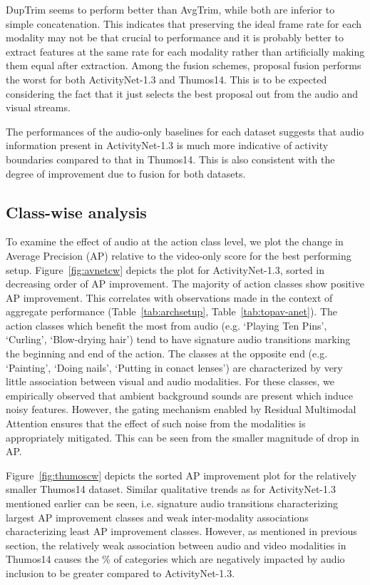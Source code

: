 \documentclass[10pt,twocolumn,letterpaper]{article}
\begin{document}
DupTrim seems to perform better than AvgTrim, while both are inferior to simple concatenation. This indicates that preserving the ideal frame rate for each modality may not be that crucial to performance and it is probably better to extract features at the same rate for each modality rather than artificially making them equal after extraction. Among the fusion schemes, proposal fusion performs the worst for both ActivityNet-1.3 and Thumos14. This is to be expected considering the fact that it just selects the best proposal out from the audio and visual streams. 

The performances of the audio-only baselines for each dataset suggests that audio information present in ActivityNet-1.3 is much more indicative of activity boundaries compared to that in Thumos14. This is also consistent with the degree of improvement due to fusion for both datasets. 

\subsection{Class-wise analysis} 

To examine the effect of audio at the action class level, we plot the change in Average Precision (AP) relative to the video-only score for the best performing setup. Figure~\ref{fig:avnetcw} depicts the plot for ActivityNet-1.3, sorted in decreasing order of AP improvement. The majority of action classes show positive AP improvement. This correlates with observations made in the context of aggregate performance (Table~\ref{tab:archsetup}, Table~\ref{tab:topav-anet}).
The action classes which benefit the most from audio (e.g. `Playing Ten Pins', `Curling', `Blow-drying hair') tend to have signature audio transitions marking the beginning and end of the action. The classes at the opposite end (e.g. `Painting', `Doing nails', `Putting in conact lenses') are characterized by very little association between visual and audio modalities. For these classes, we empirically observed that ambient background sounds are present which induce noisy features. However, the gating mechanism enabled by Residual Multimodal Attention ensures that the effect of such noise from the modalities is appropriately mitigated. This can be seen from the smaller magnitude of drop in AP.

Figure~\ref{fig:thumoscw} depicts the sorted AP improvement plot for the relatively smaller Thumos14 dataset. Similar qualitative trends as for ActivityNet-1.3 mentioned earlier can be seen, i.e. signature audio transitions characterizing largest AP improvement classes and weak inter-modality associations characterizing least AP improvement classes. However, as mentioned in previous section, the relatively weak association between audio and video modalities in Thumos14 causes the \% of categories which are negatively impacted by audio inclusion to be greater compared to ActivityNet-1.3.
\end{document}
